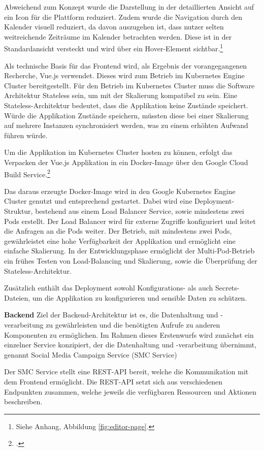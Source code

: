 Abweichend zum Konzept wurde die Darstellung in der detaillierten Ansicht auf ein Icon für die Plattform reduziert.
Zudem wurde die Navigation durch den Kalender visuell reduziert, da davon auszugehen ist, dass nutzer selten weitreichende Zeiträume im Kalender betrachten werden.
Diese ist in der Standardansicht versteckt und wird über ein Hover-Element sichtbar.\footnote{Siehe Anhang, Abbildung \ref{fig:editor-page}.}
\newpage

Als technische Basis für das Frontend wird, als Ergebnis der vorangegangenen Recherche, Vue.js verwendet.
Dieses wird zum Betrieb im Kubernetes Engine Cluster bereitgestellt.
Für den Betrieb im Kubernetes Cluster muss die Software Architektur Stateless sein, um mit der Skalierung kompatibel zu sein.
Eine Stateless-Architektur bedeutet, dass die Applikation keine Zustände speichert.
Würde die Applikation Zustände speichern, müssten diese bei einer Skalierung auf mehrere Instanzen synchronisiert werden, was zu einem erhöhten Aufwand führen würde.

Um die Applikation im Kubernetes Cluster hosten zu können, erfolgt das Verpacken der Vue.js Applikation in ein Docker-Image über den Google Cloud Build Service.\footcite{google_cloud_build}

Das daraus erzeugte Docker-Image wird in den Google Kubernetes Engine Cluster genutzt und entsprechend gestartet.
Dabei wird eine Deployment-Struktur, bestehend aus einem Load Balancer Service, sowie mindestens zwei Pods erstellt.
Der Load Balancer wird für externe Zugriffe konfiguriert und leitet die Anfragen an die Pods weiter.
Der Betrieb, mit mindestens zwei Pods, gewährleistet eine hohe Verfügbarkeit der Applikation und ermöglicht eine einfache Skalierung.
In der Entwicklungsphase ermöglicht der Multi-Pod-Betrieb ein frühes Testen von Load-Balancing und Skalierung, sowie die Überprüfung der Stateless-Architektur.

Zusätzlich enthält das Deployment sowohl Konfigurations- als auch Secrets-Dateien, um die Applikation zu konfigurieren und sensible Daten zu schützen.

\textbf{Backend}\newline
Ziel der Backend-Architektur ist es, die Datenhaltung und -verarbeitung zu gewährleisten und die benötigten Aufrufe zu anderen Komponenten zu ermöglichen.
Im Rahmen dieses Erstenwurfs wird zunächst ein einzelner Service konzipiert, der die Datenhaltung und -verarbeitung übernimmt, genannt Social Media Campaign Service (SMC Service)

Der SMC Service stellt eine REST-API bereit, welche die Kommunikation mit dem Frontend ermöglicht.
Die REST-API setzt sich aus verschiedenen Endpunkten zusammen, welche jeweils die verfügbaren Ressourcen und Aktionen beschreiben.

